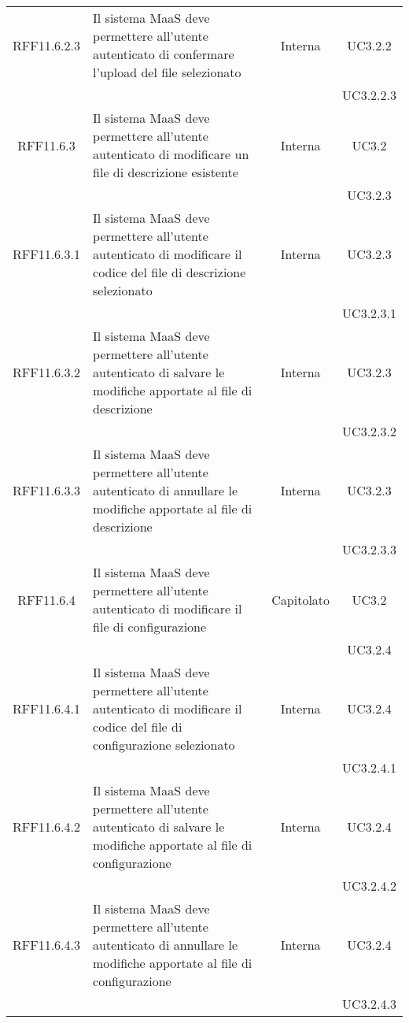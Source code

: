 \begin{longtable}{|c|p{6cm}|c|c|}
\midrule
RFF11.6.2.3
& Il sistema MaaS deve permettere all'utente autenticato di confermare l'upload del file selezionato
& Interna
& UC3.2.2\\
& & & UC3.2.2.3\\


\midrule
RFF11.6.3
& Il sistema MaaS deve permettere all'utente autenticato di modificare un file di descrizione esistente
& Interna
& UC3.2\\
& & & UC3.2.3\\

\midrule
RFF11.6.3.1
& Il sistema MaaS deve permettere all'utente autenticato di modificare il codice del file di descrizione selezionato
& Interna
& UC3.2.3\\
& & & UC3.2.3.1\\

\midrule
RFF11.6.3.2
& Il sistema MaaS deve permettere all'utente autenticato di salvare le modifiche apportate al file di descrizione
& Interna
& UC3.2.3\\
& & & UC3.2.3.2\\

\midrule
RFF11.6.3.3
& Il sistema MaaS deve permettere all'utente autenticato di annullare le modifiche apportate al file di descrizione
& Interna
& UC3.2.3\\
& & & UC3.2.3.3\\

\midrule
RFF11.6.4
& Il sistema MaaS deve permettere all'utente autenticato di modificare il file di configurazione
& Capitolato
& UC3.2\\
& & & UC3.2.4\\

\midrule
RFF11.6.4.1
& Il sistema MaaS deve permettere all'utente autenticato di modificare il codice del file di configurazione selezionato
& Interna
& UC3.2.4\\
& & & UC3.2.4.1\\

\midrule
RFF11.6.4.2
& Il sistema MaaS deve permettere all'utente autenticato di salvare le modifiche apportate al file di configurazione
& Interna
& UC3.2.4\\
& & & UC3.2.4.2\\

\midrule
RFF11.6.4.3
& Il sistema MaaS deve permettere all'utente autenticato di annullare le modifiche apportate al file di configurazione
& Interna
& UC3.2.4\\
& & & UC3.2.4.3\\


\end{longtable}
